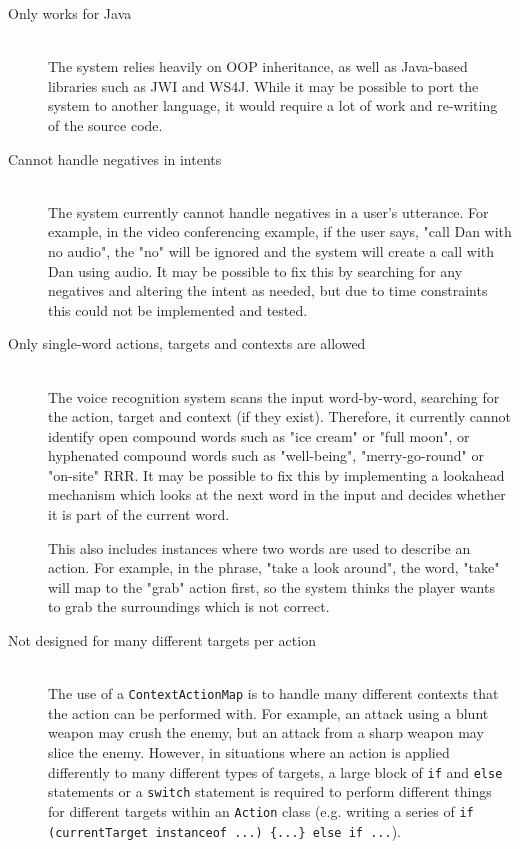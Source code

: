\documentclass[11pt]{article}
\begin{document}
\begin{description}
\item[Only works for Java] \hfill
	\\ The system relies heavily on OOP inheritance, as well as Java-based libraries such as JWI and WS4J. While it may be possible to port the system to another language, it would require a lot of work and re-writing of the source code.
\item[Cannot handle negatives in intents] \hfill
	\\ The system currently cannot handle negatives in a user's utterance. For example, in the video conferencing example, if the user says, "call Dan with no audio", the "no" will be ignored and the system will create a call with Dan using audio. It may be possible to fix this by searching for any negatives and altering the intent as needed, but due to time constraints this could not be implemented and tested.
\item[Only single-word actions, targets and contexts are allowed] \hfill
	\\ The voice recognition system scans the input word-by-word, searching for the action, target and context (if they exist). Therefore, it currently cannot identify open compound words such as "ice cream" or "full moon", or hyphenated compound words such as "well-being", "merry-go-round" or "on-site" RRR. It may be possible to fix this by implementing a lookahead mechanism which looks at the next word in the input and decides whether it is part of the current word.
	
	This also includes instances where two words are used to describe an action. For example, in the phrase, "take a look around", the word, "take" will map to the "grab" action first, so the system thinks the player wants to grab the surroundings which is not correct.
\item[Not designed for many different targets per action] \hfill
	\\ The use of a \texttt{ContextActionMap} is to handle many different contexts that the action can be performed with. For example, an attack using a blunt weapon may crush the enemy, but an attack from a sharp weapon may slice the enemy. However, in situations where an action is applied differently to many different types of targets, a large block of \texttt{if} and \texttt{else} statements or a \texttt{switch} statement is required to perform different things for different targets within an \texttt{Action} class (e.g. writing a series of \texttt{if (currentTarget instanceof ...) \{...\} else if ...}).
	

\end{description}
\end{document}
